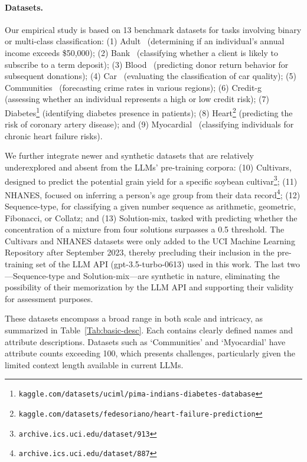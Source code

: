 \paragraph{Datasets.}
Our empirical study is based on 13 benchmark datasets for tasks involving binary or multi-class classification: (1) Adult~\cite{asuncion2007uci} (determining if an individual’s annual income exceeds \$50,000); (2) Bank~\cite{moro2014data} (classifying whether a client is likely to subscribe to a term deposit); (3) Blood~\cite{yeh2009knowledge} (predicting donor return behavior for subsequent donations); (4) Car~\cite{kadra2021well} (evaluating the classification of car quality); (5) Communities~\cite{misc_communities_and_crime_183} (forecasting crime rates in various regions); (6) Credit-g~\cite{kadra2021well} (assessing whether an individual represents a high or low credit risk); (7) Diabetes\footnote{\texttt{kaggle.com/datasets/uciml/pima-indians-diabetes-database}} (identifying diabetes presence in patients); (8) Heart\footnote{\texttt{kaggle.com/datasets/fedesoriano/heart-failure-prediction}} (predicting the risk of coronary artery disease); and (9) Myocardial~\cite{misc_myocardial_infarction_complications_579} (classifying individuals for chronic heart failure risks).

We further integrate newer and synthetic datasets that are relatively underexplored and absent from the LLMs’ pre-training corpora: (10) Cultivars, designed to predict the potential grain yield for a specific soybean cultivar\footnote{\texttt{archive.ics.uci.edu/dataset/913}}; (11) NHANES, focused on inferring a person's age group from their data record\footnote{\texttt{archive.ics.uci.edu/dataset/887}}; (12) Sequence-type, for classifying a given number sequence as arithmetic, geometric, Fibonacci, or Collatz; and (13) Solution-mix, tasked with predicting whether the concentration of a mixture from four solutions surpasses a 0.5 threshold. The Cultivars and NHANES datasets were only added to the UCI Machine Learning Repository after September 2023, thereby precluding their inclusion in the pre-training set of the LLM API (gpt-3.5-turbo-0613) used in this work. The last two—Sequence-type and Solution-mix—are synthetic in nature, eliminating the possibility of their memorization by the LLM API and supporting their validity for assessment purposes.

These datasets encompass a broad range in both scale and intricacy, as summarized in Table~\ref{Tab:basic-desc}. Each contains clearly defined names and attribute descriptions. Datasets such as `Communities' and `Myocardial' have attribute counts exceeding 100, which presents challenges, particularly given the limited context length available in current LLMs.


